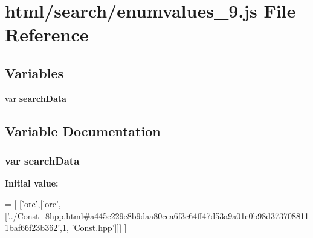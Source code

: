 \section{html/search/enumvalues\-\_\-9.js File Reference}
\label{enumvalues__9_8js}
\subsection*{Variables}
\begin{DoxyCompactItemize}
\item 
var {\bf search\-Data}
\end{DoxyCompactItemize}


\subsection{Variable Documentation}
\subsubsection[{search\-Data}]{\setlength{\rightskip}{0pt plus 5cm}var search\-Data}\label{enumvalues__9_8js_ad01a7523f103d6242ef9b0451861231e}
{\bfseries Initial value\-:}
\begin{DoxyCode}
=
[
  [\textcolor{stringliteral}{'orc'},[\textcolor{stringliteral}{'orc'},[\textcolor{stringliteral}{'../Const\_8hpp.html#a445e229e8b9daa80cea6f3c64ff47d53a9a01e0b98d3737088111baf66f23b362'},1,\textcolor{stringliteral}{
      'Const.hpp'}]]]
]
\end{DoxyCode}
